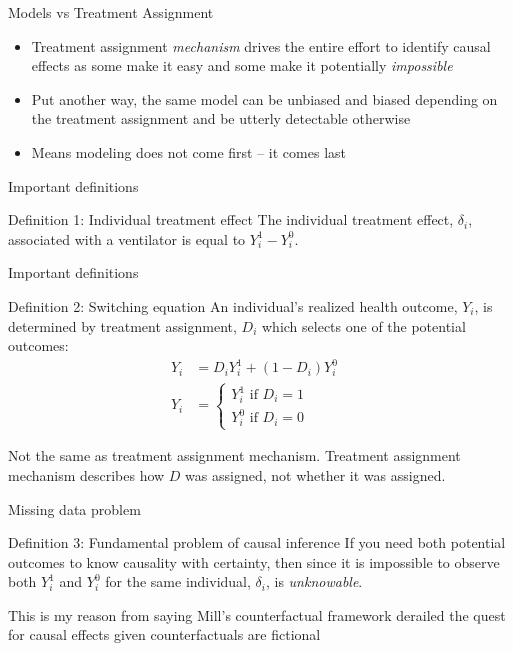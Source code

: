 \documentclass{beamer}
\begin{document}
\begin{frame}{Models vs Treatment Assignment}

\begin{itemize}
    \item Treatment assignment \emph{mechanism} drives the entire effort to identify causal effects as some make it easy and some make it potentially \emph{impossible}
	\item Put another way, the same model can be unbiased and biased depending on the treatment assignment and be utterly detectable otherwise
	\item Means modeling does not come first -- it comes last
	\end{itemize}
\end{frame}

\begin{frame}{Important definitions}

    \begin{block}{Definition 1: Individual treatment effect}
      The individual treatment effect,  $\delta_i$, associated with a ventilator is equal to $Y_i^1-Y_i^0$.
    \end{block}
\end{frame}


\begin{frame}{Important definitions}


    \begin{block}{Definition 2: Switching equation}
      An individual's realized health outcome, $Y_i$, is determined by treatment assignment, $D_i$ which selects one of the potential outcomes:
      \begin{eqnarray*}
        Y_i& = D_iY^1_i+(1-D_i)Y^0_i& \\
        Y_i& = \begin{cases}
          Y^1_i\text{ if }D_i=1 \\
          Y^0_i\text{ if }D_i=0
        \end{cases}
      \end{eqnarray*}
    \end{block}
    
    Not the same as treatment assignment mechanism.  Treatment assignment mechanism describes how $D$ was assigned, not whether it was assigned.

\end{frame}


\begin{frame}{Missing data problem}


    \begin{block}{Definition 3: Fundamental problem of causal inference}
      If you need both potential outcomes to know causality with certainty, then since it is impossible to observe both $Y_i^1$ and $Y_i^0$ for the same individual, $\delta_i$, is \emph{unknowable}.
    \end{block}

This is my reason from saying Mill's counterfactual framework derailed the quest for causal effects given counterfactuals are fictional
    
\end{frame}
\end{document}
